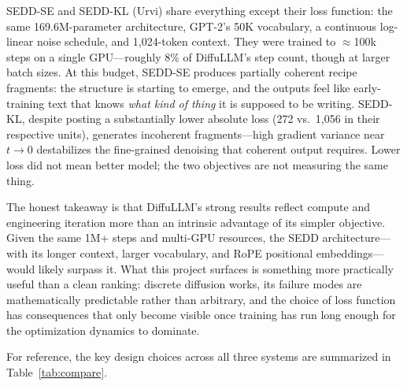 \documentclass[11pt,a4paper]{article}
\begin{document}
SEDD-SE and SEDD-KL (Urvi) share everything except their loss function: the same 169.6M-parameter architecture, GPT-2's 50K vocabulary, a continuous log-linear noise schedule, and 1,024-token context. They were trained to $\approx$100k steps on a single GPU---roughly 8\% of DiffuLLM's step count, though at larger batch sizes. At this budget, SEDD-SE produces partially coherent recipe fragments: the structure is starting to emerge, and the outputs feel like early-training text that knows \emph{what kind of thing} it is supposed to be writing. SEDD-KL, despite posting a substantially lower absolute loss (272 vs.\ 1,056 in their respective units), generates incoherent fragments---high gradient variance near $t \to 0$ destabilizes the fine-grained denoising that coherent output requires. Lower loss did not mean better model; the two objectives are not measuring the same thing.

The honest takeaway is that DiffuLLM's strong results reflect compute and engineering iteration more than an intrinsic advantage of its simpler objective. Given the same 1M+ steps and multi-GPU resources, the SEDD architecture---with its longer context, larger vocabulary, and RoPE positional embeddings---would likely surpass it. What this project surfaces is something more practically useful than a clean ranking: discrete diffusion works, its failure modes are mathematically predictable rather than arbitrary, and the choice of loss function has consequences that only become visible once training has run long enough for the optimization dynamics to dominate.

For reference, the key design choices across all three systems are summarized in Table~\ref{tab:compare}.
\end{document}
